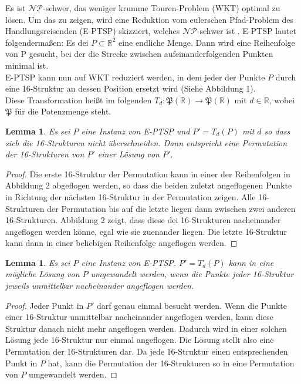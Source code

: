 \documentclass[a4paper,10pt,ngerman]{scrartcl}
\newtheorem{lemma}[theorem]{Lemma}
\begin{document}
Es ist $\mathcal{NP}$-schwer, das weniger krumme Touren-Problem (WKT) optimal
zu lösen. Um das zu zeigen, wird eine Reduktion vom eulerschen Pfad-Problem des
Handlungsreisenden (E-PTSP) skizziert, welches $\mathcal{NP}$-schwer ist \cite{papadimitriou_1977}. E-PTSP lautet folgendermaßen: Es dei $P \subset
  \mathbb{R}^2$ eine endliche Menge. Dann wird eine Reihenfolge von P gesucht,
bei der die Strecke zwischen aufeinanderfolgenden Punkten minimal ist. \\
E-PTSP kann nun auf WKT reduziert werden, in dem jeder der Punkte $P$ durch
eine 16-Struktur an dessen Position ersetzt wird (Siehe Abbildung 1).\\
Diese Transformation heißt im folgenden $T_d: \mathfrak{P}(\mathbb{R}) \rightarrow \mathfrak{P}(\mathbb{R})$
mit $d \in \mathbb{R}$,
wobei $\mathfrak{P}$ für die Potenzmenge steht.
\begin{lemma}
  Es sei $P$ eine Instanz von E-PTSP und $P'=T_d(P)$ mit $d$ so dass sich die 16-Strukturen nicht überschneiden.
  Dann entspricht eine Permutation der 16-Strukturen von $P'$ einer Lösung von $P'$.
\end{lemma}
\begin{proof}
  Die erste 16-Struktur der Permutation kann in einer der Reihenfolgen in Abbildung 2 abgeflogen werden, so dass
  die beiden zuletzt angeflogenen Punkte in Richtung der nächsten 16-Struktur in der Permutation zeigen.
  Alle 16-Strukturen der Permutation bis auf die letzte liegen dann zwischen zwei anderen 16-Strukturen.
  Abbildung 2 zeigt, dass diese dei 16-Strukturen nacheinander angeflogen werden könne, egal wie sie zuenander
  liegen. Die letzte 16-Struktur kann dann in einer beliebigen Reihenfolge angeflogen werden.
\end{proof}
\begin{lemma}
  Es sei $P$ eine Instanz von E-PTSP.
  $P' = T_d(P)$ kann in eine mögliche Lösung von $P$ umgewandelt werden,
  wenn die Punkte jeder 16-Struktur jeweils unmittelbar nacheinander angeflogen werden.
\end{lemma}
\begin{proof}
  Jeder Punkt in $P'$ darf genau einmal besucht werden. Wenn die Punkte einer 16-Struktur
  unmittelbar nacheinander angeflogen werden, kann diese Struktur danach nicht mehr angeflogen werden.
  Dadurch wird in einer solchen Lösung jede 16-Struktur nur einmal angeflogen. Die Lösung stellt also
  eine Permutation der 16-Strukturen dar. Da jede 16-Struktur einen entsprechenden Punkt in $P$ hat,
  kann die Permutation der 16-Strukturen so in eine Permutation von $P$ umgewandelt werden.
\end{proof}
\end{document}
